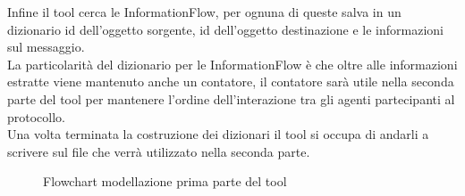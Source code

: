 Infine il tool cerca le InformationFlow, per ognuna di queste salva in un dizionario id dell'oggetto sorgente, id dell'oggetto destinazione e le informazioni sul messaggio.\\
La particolarità del dizionario per le InformationFlow è che oltre alle informazioni estratte viene mantenuto anche un contatore, il contatore sarà utile nella seconda parte del tool per mantenere l'ordine dell'interazione tra gli agenti partecipanti al protocollo.\\
Una volta terminata la costruzione dei dizionari il tool si occupa di andarli a scrivere sul file che verrà utilizzato nella seconda parte.\\
\begin{figure}[h!] 
    \centering 
    \caption{Flowchart modellazione prima parte del tool}
    \label{fig:p1} 
\end{figure}
